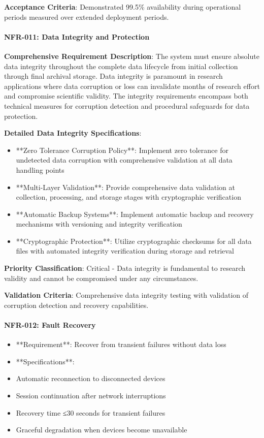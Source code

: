 \documentclass[12pt,a4paper]{report}
\begin{document}
\textbf{Acceptance Criteria}: Demonstrated 99.5\% availability during operational periods measured over extended deployment
periods.

\paragraph{NFR-011: Data Integrity and Protection}

\textbf{Comprehensive Requirement Description}: The system must ensure absolute data integrity throughout the complete data
lifecycle from initial collection through final archival storage. Data integrity is paramount in research applications
where data corruption or loss can invalidate months of research effort and compromise scientific validity. The integrity
requirements encompass both technical measures for corruption detection and procedural safeguards for data protection.

\textbf{Detailed Data Integrity Specifications}:

\begin{itemize}
\item **Zero Tolerance Corruption Policy**: Implement zero tolerance for undetected data corruption with comprehensive
  validation at all data handling points
\item **Multi-Layer Validation**: Provide comprehensive data validation at collection, processing, and storage stages with
  cryptographic verification
\item **Automatic Backup Systems**: Implement automatic backup and recovery mechanisms with versioning and integrity
  verification
\item **Cryptographic Protection**: Utilize cryptographic checksums for all data files with automated integrity verification
  during storage and retrieval

\end{itemize}
\textbf{Priority Classification}: Critical - Data integrity is fundamental to research validity and cannot be compromised
under any circumstances.

\textbf{Validation Criteria}: Comprehensive data integrity testing with validation of corruption detection and recovery
capabilities.

\paragraph{NFR-012: Fault Recovery}

\begin{itemize}
\item **Requirement**: Recover from transient failures without data loss
\item **Specifications**:
\item Automatic reconnection to disconnected devices
\item Session continuation after network interruptions
\item Recovery time ≤30 seconds for transient failures
\item Graceful degradation when devices become unavailable

\end{itemize}
\end{document}
